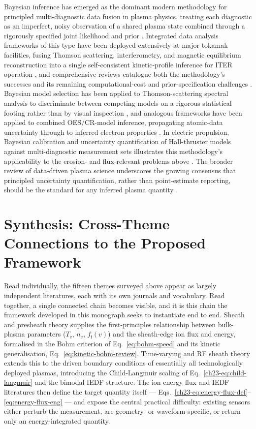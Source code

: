 Bayesian inference has emerged as the dominant modern methodology for principled multi-diagnostic data fusion in plasma physics, treating each diagnostic as an imperfect, noisy observation of a shared plasma state combined through a rigorously specified joint likelihood and prior \cite{ref0706}. Integrated data analysis frameworks of this type have been deployed extensively at major tokamak facilities, fusing Thomson scattering, interferometry, and magnetic equilibrium reconstruction into a single self-consistent kinetic-profile inference for ITER operation \cite{ref0706}, and comprehensive reviews catalogue both the methodology's successes and its remaining computational-cost and prior-specification challenges \cite{ref0710}. Bayesian model selection has been applied to Thomson-scattering spectral analysis to discriminate between competing models on a rigorous statistical footing rather than by visual inspection \cite{ref0684}, and analogous frameworks have been applied to combined OES/CR-model inference, propagating atomic-data uncertainty through to inferred electron properties \cite{ref0275}. In electric propulsion, Bayesian calibration and uncertainty quantification of Hall-thruster models against multi-diagnostic measurement sets illustrates this methodology's applicability to the erosion- and flux-relevant problems above \cite{ref0719}. The broader review of data-driven plasma science underscores the growing consensus that principled uncertainty quantification, rather than point-estimate reporting, should be the standard for any inferred plasma quantity \cite{ref0711}.

\section{Synthesis: Cross-Theme Connections to the Proposed Framework}

Read individually, the fifteen themes surveyed above appear as largely independent literatures, each with its own journals and vocabulary. Read together, a single connected chain becomes visible, and it is this chain the framework developed in this monograph seeks to instantiate end to end. Sheath and presheath theory supplies the first-principles relationship between bulk-plasma parameters ($T_{\mathrm{e}}$, $n_{\mathrm{e}}$, $f_{\mathrm{i}}(v)$) and the sheath-edge ion flux and energy, formalised in the Bohm criterion of Eq.~\eqref{eq:bohm-speed} and its kinetic generalisation, Eq.~\eqref{eq:kinetic-bohm-review}. Time-varying and RF sheath theory extends this to the driven boundary conditions of essentially all technologically deployed plasmas, introducing the Child-Langmuir scaling of Eq.~\eqref{ch23-eq:child-langmuir} and the bimodal IEDF structure. The ion-energy-flux and IEDF literatures then define the target quantity itself — Eqs.~\eqref{ch23-eq:energy-flux-def}--\eqref{eq:energy-flux-eng} — and expose the central practical difficulty: existing sensors either perturb the measurement, are geometry- or waveform-specific, or return only an energy-integrated quantity.

